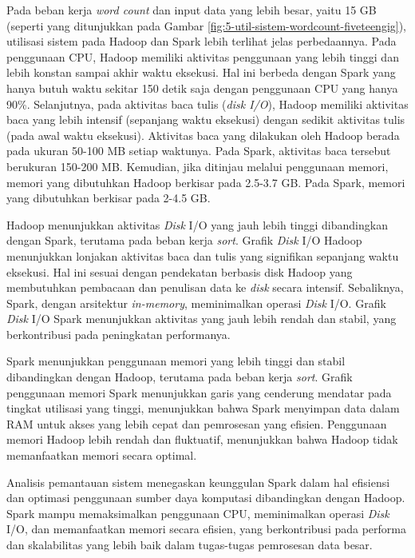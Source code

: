 Pada beban kerja \textit{word count} dan input data yang lebih besar, yaitu 15 GB (seperti yang ditunjukkan pada Gambar \ref{fig:5-util-sistem-wordcount-fiveteengig}), utilisasi sistem pada Hadoop dan Spark lebih terlihat jelas perbedaannya. Pada penggunaan CPU, Hadoop memiliki aktivitas penggunaan yang lebih tinggi dan lebih konstan sampai akhir waktu eksekusi. Hal ini berbeda dengan Spark yang hanya butuh waktu sekitar 150 detik saja dengan penggunaan CPU yang hanya 90\%. Selanjutnya, pada aktivitas baca tulis (\textit{disk I/O}), Hadoop memiliki aktivitas baca yang lebih intensif (sepanjang waktu eksekusi) dengan sedikit aktivitas tulis (pada awal waktu eksekusi). Aktivitas baca yang dilakukan oleh Hadoop berada pada ukuran 50-100 MB setiap waktunya. Pada Spark, aktivitas baca tersebut berukuran 150-200 MB. Kemudian, jika ditinjau melalui penggunaan memori, memori yang dibutuhkan Hadoop berkisar pada 2.5-3.7 GB. Pada Spark, memori yang dibutuhkan berkisar pada 2-4.5 GB.  

Hadoop menunjukkan aktivitas \textit{Disk} I/O yang jauh lebih tinggi dibandingkan dengan Spark, terutama pada beban kerja \textit{sort}. Grafik \textit{Disk} I/O Hadoop menunjukkan lonjakan aktivitas baca dan tulis yang signifikan sepanjang waktu eksekusi. Hal ini sesuai dengan pendekatan berbasis disk Hadoop yang membutuhkan pembacaan dan penulisan data ke \textit{disk} secara intensif. Sebaliknya, Spark, dengan arsitektur \textit{in-memory}, meminimalkan operasi \textit{Disk} I/O. Grafik \textit{Disk} I/O Spark menunjukkan aktivitas yang jauh lebih rendah dan stabil, yang berkontribusi pada peningkatan performanya.

Spark menunjukkan penggunaan memori yang lebih tinggi dan stabil dibandingkan dengan Hadoop, terutama pada beban kerja \textit{sort}. Grafik penggunaan memori Spark menunjukkan garis yang cenderung mendatar pada tingkat utilisasi yang tinggi, menunjukkan bahwa Spark menyimpan data dalam RAM untuk akses yang lebih cepat dan pemrosesan yang efisien. Penggunaan memori Hadoop lebih rendah dan fluktuatif, menunjukkan bahwa Hadoop tidak memanfaatkan memori secara optimal. 

Analisis pemantauan sistem menegaskan keunggulan Spark dalam hal efisiensi dan optimasi penggunaan sumber daya komputasi dibandingkan dengan Hadoop. Spark mampu memaksimalkan penggunaan CPU, meminimalkan operasi \textit{Disk} I/O, dan memanfaatkan memori secara efisien, yang berkontribusi pada performa dan skalabilitas yang lebih baik dalam tugas-tugas pemrosesan data besar.

